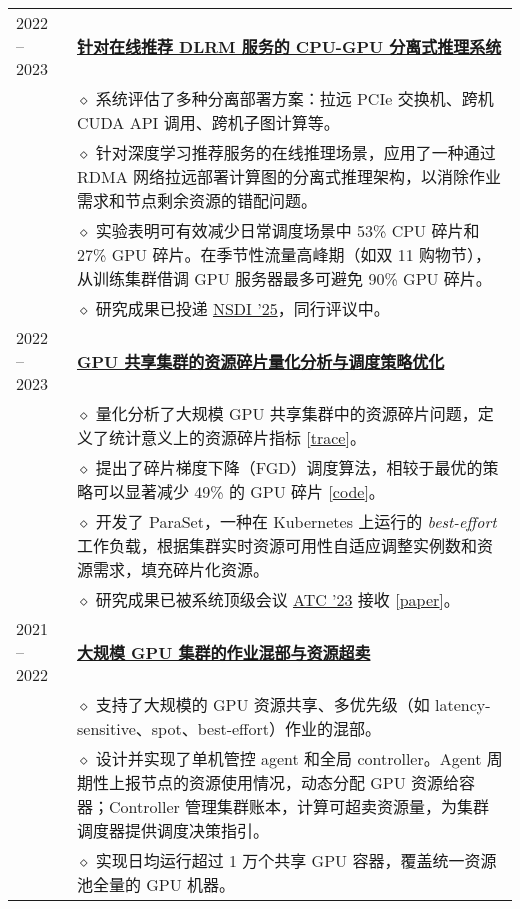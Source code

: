 \documentclass[letterpaper, 10pt]{article}
\begin{document}
\begin{longtable}{p{0.7in}p{6.0in}}
2022 -- 2023
& \textbf{\underline{针对在线推荐 DLRM 服务的 CPU-GPU 分离式推理系统}} \hfill \\
    & $\diamond$ 系统评估了多种分离部署方案：拉远 PCIe 交换机、跨机 CUDA API 调用、跨机子图计算等。\\
    & $\diamond$ 针对深度学习推荐服务的在线推理场景，应用了一种通过 RDMA 网络拉远部署计算图的分离式推理架构，以消除作业需求和节点剩余资源的错配问题。\\
    & $\diamond$ 实验表明可有效减少日常调度场景中 53\% CPU 碎片和 27\% GPU 碎片。在季节性流量高峰期（如双 11 购物节），从训练集群借调 GPU 服务器最多可避免 90\% GPU 碎片。\\
    & $\diamond$ 研究成果已投递 \underline{NSDI '25}，同行评议中。\\

2022 -- 2023
& \textbf{\underline{GPU 共享集群的资源碎片量化分析与调度策略优化}} \\
    & $\diamond$ 量化分析了大规模 GPU 共享集群中的资源碎片问题，定义了统计意义上的资源碎片指标 [\href{https://github.com/alibaba/clusterdata/tree/master/cluster-trace-gpu-v2023}{\underline{trace}}]。\\
    & $\diamond$ 提出了碎片梯度下降（FGD）调度算法，相较于最优的策略可以显著减少 49\% 的 GPU 碎片 [\href{https://github.com/hkust-adsl/kubernetes-scheduler-simulator}{\underline{code}}]。\\
    & $\diamond$ 开发了 ParaSet，一种在 Kubernetes 上运行的 \textit{best-effort} 工作负载，根据集群实时资源可用性自适应调整实例数和资源需求，填充碎片化资源。\\
    & $\diamond$ 研究成果已被系统顶级会议 \underline{ATC '23} 接收 [\href{https://www.usenix.org/conference/atc23/presentation/weng}{\underline{paper}}]。\\

2021 -- 2022
& \textbf{\underline{大规模 GPU 集群的作业混部与资源超卖}} \hfill \\
    & $\diamond$ 支持了大规模的 GPU 资源共享、多优先级（如 latency-sensitive、spot、best-effort）作业的混部。\\
    & $\diamond$ 设计并实现了单机管控 agent 和全局 controller。Agent 周期性上报节点的资源使用情况，动态分配 GPU 资源给容器；Controller 管理集群账本，计算可超卖资源量，为集群调度器提供调度决策指引。\\
    & $\diamond$ 实现日均运行超过 1 万个共享 GPU 容器，覆盖统一资源池全量的 GPU 机器。\\


\end{longtable}
\end{document}
